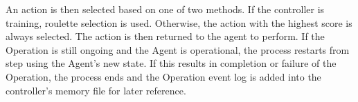 An action is then selected based on one of two methods.
If the controller is training, roulette selection is used.
Otherwise, the action with the highest score is always selected.
The action is then returned to the agent to perform.
If the Operation is still ongoing and the Agent is operational, the process restarts from step  using the Agent's new state.
If this results in completion or failure of the Operation, the process ends and the Operation event log is added into the controller's memory file for later reference.




%


